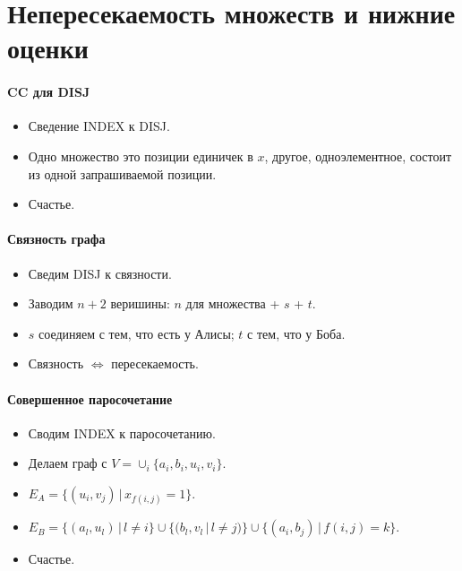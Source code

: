 \section{Непересекаемость множеств и нижние оценки} %
\label{sec:sd_lb}

\paragraph{CC для DISJ} %
\label{par:cc_disj}

\begin{itemize}
	\item Сведение INDEX к DISJ. 
	\item Одно множество это позиции единичек в $x$, другое, одноэлементное, состоит из одной запрашиваемой позиции.
	\item Счастье.
\end{itemize}


\paragraph{Связность графа} %
\label{par:st_connectivity}

\begin{itemize}
	\item Сведим DISJ к связности.
	\item Заводим $n + 2$ веришины: $n$ для множества + $s$ + $t$. 
	\item $s$ соединяем с тем, что есть у Алисы; $t$ с тем, что у Боба.
	\item Связность $\Leftrightarrow$ пересекаемость.
\end{itemize}


\paragraph{Совершенное паросочетание} %
\label{par:perfect_matching}

\begin{itemize}
	\item Сводим INDEX к паросочетанию.
	\item Делаем граф с $V = \cup_i \{a_i, b_i, u_i, v_i\}$.
	\item $E_A = \{ (u_i, v_j) \,|\, x_{f(i, j)} = 1 \}$.
	\item $E_B = \{(a_l, u_l) \,|\,l \neq i\} \cup \{(b_l, v_l \,|\, l \neq j) \} \cup \{(a_i, b_j)\,|\,f(i, j) = k\}$.
	\item Счастье.
\end{itemize}

